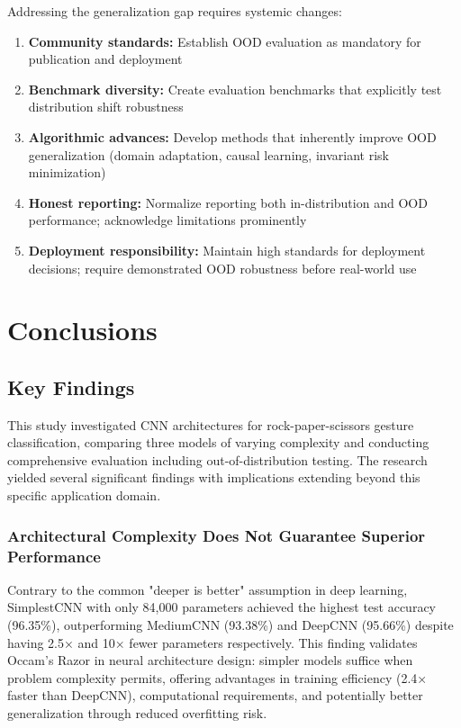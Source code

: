 \documentclass[12pt,a4paper]{article}
\begin{document}
Addressing the generalization gap requires systemic changes:

\begin{enumerate}
    \item \textbf{Community standards:} Establish OOD evaluation as mandatory for publication and deployment
    \item \textbf{Benchmark diversity:} Create evaluation benchmarks that explicitly test distribution shift robustness
    \item \textbf{Algorithmic advances:} Develop methods that inherently improve OOD generalization (domain adaptation, causal learning, invariant risk minimization)
    \item \textbf{Honest reporting:} Normalize reporting both in-distribution and OOD performance; acknowledge limitations prominently
    \item \textbf{Deployment responsibility:} Maintain high standards for deployment decisions; require demonstrated OOD robustness before real-world use
\end{enumerate}

\section{Conclusions}

\subsection{Key Findings}

This study investigated CNN architectures for rock-paper-scissors gesture classification, comparing three models of varying complexity and conducting comprehensive evaluation including out-of-distribution testing. The research yielded several significant findings with implications extending beyond this specific application domain.

\subsubsection{Architectural Complexity Does Not Guarantee Superior Performance}

Contrary to the common "deeper is better" assumption in deep learning, SimplestCNN with only 84,000 parameters achieved the highest test accuracy (96.35\%), outperforming MediumCNN (93.38\%) and DeepCNN (95.66\%) despite having 2.5× and 10× fewer parameters respectively. This finding validates Occam's Razor in neural architecture design: simpler models suffice when problem complexity permits, offering advantages in training efficiency (2.4× faster than DeepCNN), computational requirements, and potentially better generalization through reduced overfitting risk.
\end{document}
